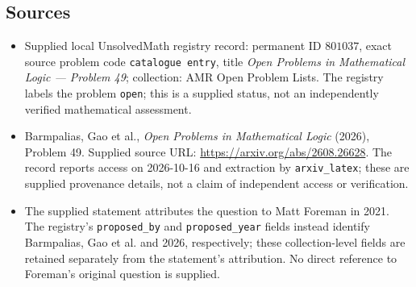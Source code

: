 \documentclass[11pt]{article}
\begin{document}
\subsection{Sources}
\begin{itemize}
\item Supplied local UnsolvedMath registry record: permanent ID \(801037\), exact source problem code \texttt{catalogue entry}, title \emph{Open Problems in Mathematical Logic --- Problem 49}; collection: AMR Open Problem Lists. The registry labels the problem \texttt{open}; this is a supplied status, not an independently verified mathematical assessment.
\item Barmpalias, Gao et al., \emph{Open Problems in Mathematical Logic} (2026), Problem 49. Supplied source URL: \url{https://arxiv.org/abs/2608.26628}. The record reports access on 2026-10-16 and extraction by \texttt{arxiv\_latex}; these are supplied provenance details, not a claim of independent access or verification.
\item The supplied statement attributes the question to Matt Foreman in 2021. The registry's \texttt{proposed\_by} and \texttt{proposed\_year} fields instead identify Barmpalias, Gao et al. and 2026, respectively; these collection-level fields are retained separately from the statement's attribution. No direct reference to Foreman's original question is supplied.
\end{itemize}
\end{document}
